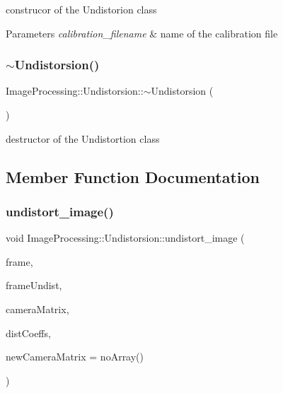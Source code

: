 construcor of the Undistorion class 
\begin{DoxyParams}{Parameters}
{\em calibration\+\_\+filename} & name of the calibration file \\
\hline
\end{DoxyParams}
\mbox{\label{class_image_processing_1_1_undistorsion_a1ce4c30154a1ae1253b8b0d990561ac5}} 
\subsubsection{\texorpdfstring{$\sim$\+Undistorsion()}{~Undistorsion()}}
{\footnotesize\ttfamily Image\+Processing\+::\+Undistorsion\+::$\sim$\+Undistorsion (\begin{DoxyParamCaption}{ }\end{DoxyParamCaption})}

destructor of the Undistortion class 

\subsection{Member Function Documentation}
\mbox{\label{class_image_processing_1_1_undistorsion_ab286d4b5746b8b2716fab24578c27a44}} 
\subsubsection{\texorpdfstring{undistort\+\_\+image()}{undistort\_image()}}
{\footnotesize\ttfamily void Image\+Processing\+::\+Undistorsion\+::undistort\+\_\+image (\begin{DoxyParamCaption}\item[{cv\+::\+Mat}]{frame,  }\item[{cv\+::\+Mat}]{frame\+Undist,  }\item[{Input\+Array}]{camera\+Matrix,  }\item[{Input\+Array}]{dist\+Coeffs,  }\item[{Input\+Array}]{new\+Camera\+Matrix = {\ttfamily noArray()} }\end{DoxyParamCaption})}

